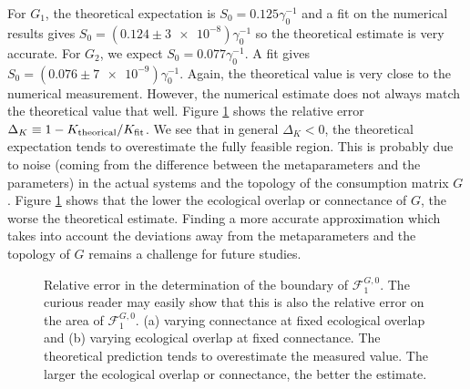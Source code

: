 \documentclass[12pt, titlepage]{report}
\begin{document}
 For $G_1$, the theoretical expectation is $S_0 = 0.125 \gamma_0^{-1}$ and a fit on the numerical results gives $S_0=(\num[scientific-notation=false]{0.124}\pm\num{3e-8}) \gamma_0^{-1}$ so the theoretical estimate is very accurate.
For $G_2$, we expect $S_0 = 0.077 \gamma_0^{-1}$. A fit gives $S_0=(\num[scientific-notation=false]{0.076}\pm\num{7e-9})\gamma_0^{-1}$. Again, the theoretical value is very close to the numerical measurement.
However, the numerical estimate does not always match the theoretical value that well. Figure \ref{fig: deviation away from theory feasibility} shows the relative error $\Delta_K \equiv 1 - K_\text{theorical}/K_\text{fit}$. We see that in general $\Delta_K < 0$, \ie the theoretical expectation tends to overestimate the fully feasible region. This is probably due to noise (\ie coming from the difference between the metaparameters and the parameters) in the actual systems and the topology of the consumption matrix $G$. Figure \ref{fig: deviation away from theory feasibility} shows that the lower the ecological overlap or connectance of $G$, the worse the theoretical estimate. Finding a more accurate approximation which takes into account the deviations away from the metaparameters and the topology of $G$ remains a challenge for future studies.

\begin{figure}[h!]
	\captionsetup[subfigure]{captionskip = -175pt, margin = 45pt}
\captionsetup[subfigure]{captionskip = -175pt, margin = 45pt}
\caption{Relative error in the determination of the boundary of $\mathcal{F}^{G,0}_1$. The curious reader may easily show that this is also the relative error on the area of $\mathcal{F}^{G,0}_1$. (a) varying connectance at fixed ecological overlap and (b) varying ecological overlap at fixed connectance. The theoretical prediction tends to overestimate the measured value. The larger the ecological overlap or connectance, the better the estimate.}\label{fig: deviation away from theory feasibility}
\end{figure}
\end{document}
